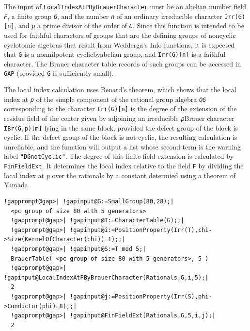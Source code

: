 \documentclass[a4paper,11pt]{report}
\begin{document}
{{{ The input of \texttt{LocalIndexAtPByBrauerCharacter} must be an abelian number field \mbox{\texttt{\mdseries\slshape F}}, a finite group \mbox{\texttt{\mdseries\slshape G}}, and the number \mbox{\texttt{\mdseries\slshape n}} of an ordinary irreducible character \texttt{Irr(G)[n]}, and \mbox{\texttt{\mdseries\slshape p}} a prime divisor of the order of \mbox{\texttt{\mdseries\slshape G}}. Since this function is intended to be used for faithful characters of groups
that are the defining groups of non\texttt{}cyclic cyclotomic
algebras that result from \textsf{Wedderga}'s Info functions, it is expected that \texttt{G} is a non\texttt{}nilpotent
cyclic\texttt{}by\texttt{}abelian group, and \texttt{Irr(G)[n]} is a faithful character. The Brauer character table records of such groups can
be accessed in \texttt{GAP} (provided \texttt{G} is sufficiently small). 

 The local index calculation uses Benard's theorem, which shows that the local
index at \mbox{\texttt{\mdseries\slshape p}} of the simple component of the rational group algebra \mbox{\texttt{\mdseries\slshape QG}} corresponding to the character \texttt{Irr(G)[n]} is the degree of the extension of the residue field of the center given by
adjoining an irreducible \mbox{\texttt{\mdseries\slshape p}}\texttt{}Brauer character \texttt{IBr(G,p)[m]} lying in the same block, provided the defect group of the block is cyclic. If
the defect group of the block is not cyclic, the resulting calculation is
unreliable, and the function will output a list whose second term is the
warning label \texttt{"DGnotCyclic"}. The degree of this finite field extension is calculated by \texttt{FinFieldExt}. It determines the local index relative to the field \texttt{F} by dividing the local index at $p$ over the rationals by a constant determied using a theorem of Yamada. 

 
\begin{Verbatim}[commandchars=!@|,fontsize=\small,frame=single,label=Example]
  !gapprompt@gap>| !gapinput@G:=SmallGroup(80,28);|
  <pc group of size 80 with 5 generators>
  !gapprompt@gap>| !gapinput@T:=CharacterTable(G);;|
  !gapprompt@gap>| !gapinput@i:=PositionProperty(Irr(T),chi->Size(KernelOfCharacter(chi))=1);;|
  !gapprompt@gap>| !gapinput@S:=T mod 5;|
  BrauerTable( <pc group of size 80 with 5 generators>, 5 )
  !gapprompt@gap>| !gapinput@LocalIndexAtPByBrauerCharacter(Rationals,G,i,5);|
  2
  !gapprompt@gap>| !gapinput@j:=PositionProperty(Irr(S),phi->Conductor(phi)=8);;|
  !gapprompt@gap>| !gapinput@FinFieldExt(Rationals,G,5,i,j);|
  2
\end{Verbatim}
 
}}}
\end{document}
